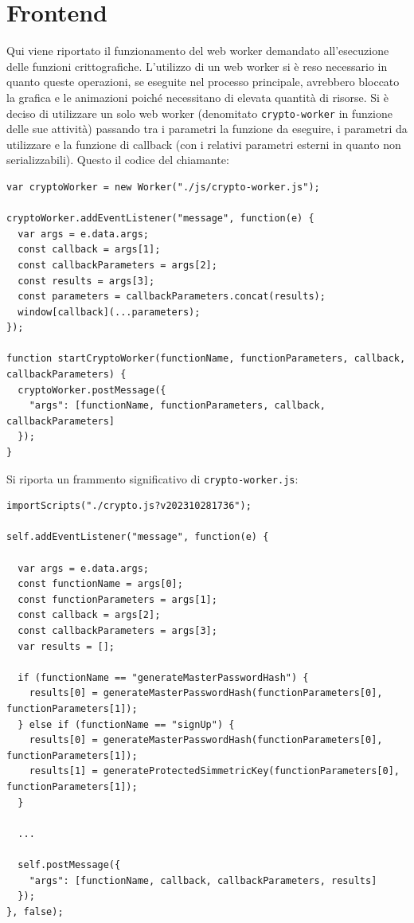 \documentclass[a4paper]{report}
\begin{document}
\section{Frontend}
Qui viene riportato il funzionamento del web worker demandato all'esecuzione delle funzioni crittografiche. L'utilizzo di un web worker si è reso necessario in quanto queste operazioni, se eseguite nel processo principale, avrebbero bloccato la grafica e le animazioni poiché necessitano di elevata quantità di risorse.
Si è deciso di utilizzare un solo web worker (denomitato \texttt{crypto-worker} in funzione delle sue attività) passando tra i parametri la funzione da eseguire, i parametri da utilizzare e la funzione di callback (con i relativi parametri esterni in quanto non serializzabili).
Questo il codice del chiamante:
\begin{verbatim}
var cryptoWorker = new Worker("./js/crypto-worker.js");

cryptoWorker.addEventListener("message", function(e) {
  var args = e.data.args;
  const callback = args[1];
  const callbackParameters = args[2];
  const results = args[3];
  const parameters = callbackParameters.concat(results);
  window[callback](...parameters);
});

function startCryptoWorker(functionName, functionParameters, callback, callbackParameters) {
  cryptoWorker.postMessage({
    "args": [functionName, functionParameters, callback, callbackParameters]
  });
}
\end{verbatim}
Si riporta un frammento significativo di \texttt{crypto-worker.js}:
\begin{verbatim}
importScripts("./crypto.js?v202310281736");

self.addEventListener("message", function(e) {

  var args = e.data.args;
  const functionName = args[0];
  const functionParameters = args[1];
  const callback = args[2];
  const callbackParameters = args[3];
  var results = [];

  if (functionName == "generateMasterPasswordHash") {
    results[0] = generateMasterPasswordHash(functionParameters[0], functionParameters[1]);
  } else if (functionName == "signUp") {
    results[0] = generateMasterPasswordHash(functionParameters[0], functionParameters[1]);
    results[1] = generateProtectedSimmetricKey(functionParameters[0], functionParameters[1]);
  }

  ...

  self.postMessage({
    "args": [functionName, callback, callbackParameters, results]
  });
}, false);
\end{verbatim}
\end{document}
